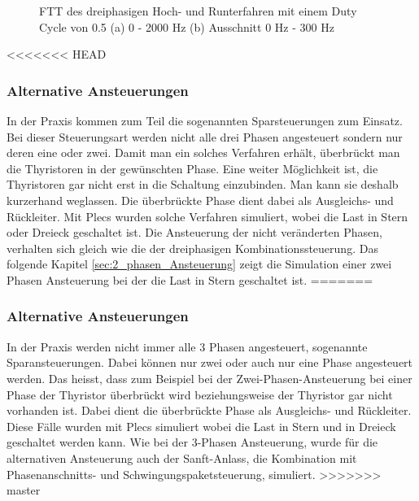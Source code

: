 \begin{figure}[ht!]
	\centering
	\qquad
	\caption{FTT des dreiphasigen Hoch- und Runterfahren mit einem Duty Cycle von 0.5 (a) 0 - 2000 Hz (b) Ausschnitt 0 Hz - 300 Hz}
	\label{fig:dreiphasiges_Sanft_anlassen_FTT}
\end{figure}

\newpage

<<<<<<< HEAD
\subsubsection{Alternative Ansteuerungen}
In der Praxis kommen zum Teil die sogenannten Sparsteuerungen zum Einsatz. Bei dieser Steuerungsart werden nicht alle drei Phasen angesteuert sondern nur deren eine oder zwei. Damit man ein solches Verfahren erhält, überbrückt man die Thyristoren in der gewünschten Phase. Eine weiter Möglichkeit ist, die Thyristoren gar nicht erst in die Schaltung einzubinden. Man kann sie deshalb kurzerhand weglassen. Die überbrückte Phase dient dabei als Ausgleichs- und Rückleiter. Mit Plecs wurden solche Verfahren simuliert, wobei die Last in Stern oder Dreieck geschaltet ist. Die Ansteuerung der nicht veränderten Phasen, verhalten sich gleich wie die der dreiphasigen Kombinationssteuerung. Das folgende Kapitel \ref{sec:2_phasen_Ansteuerung} zeigt die Simulation einer zwei Phasen Ansteuerung bei der die Last in Stern geschaltet ist. 
=======
\subsubsection{Alternative Ansteuerungen}\label{Spar-Ansteuerung}
In der Praxis werden nicht immer alle 3 Phasen angesteuert, sogenannte Sparansteuerungen. Dabei können nur zwei oder auch nur eine Phase angesteuert werden. Das heisst, dass zum Beispiel bei der Zwei-Phasen-Ansteuerung bei einer Phase der Thyristor überbrückt wird beziehungsweise der Thyristor gar nicht vorhanden ist. Dabei dient die überbrückte Phase als Ausgleichs- und Rückleiter. Diese Fälle wurden mit Plecs simuliert wobei die Last in Stern und in Dreieck geschaltet werden kann. Wie bei der 3-Phasen Ansteuerung, wurde für die alternativen Ansteuerung auch der Sanft-Anlass, die Kombination mit Phasenanschnitts- und Schwingungspaketsteuerung, simuliert.
>>>>>>> master


